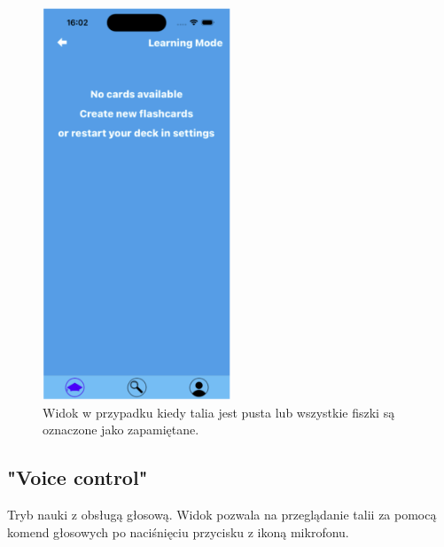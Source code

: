 \begin{figure}[H]
    \centering
    \includegraphics[width=0.5\textwidth]{chapters/chapter_10/images_mobile/mobile_learn_2}
    \caption{Widok w przypadku kiedy talia jest pusta lub wszystkie fiszki są oznaczone jako zapamiętane.}
    \label{img:mobile_learn_2}
\end{figure}


\subsection{"Voice control"}
Tryb nauki z obsługą głosową. Widok pozwala na przeglądanie talii za pomocą komend głosowych po naciśnięciu przycisku z ikoną mikrofonu.

